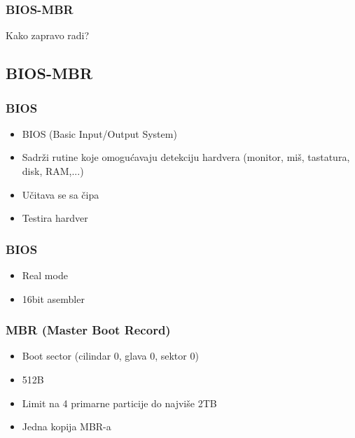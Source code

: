 \documentclass{beamer}
\begin{document}
\begin{frame}
    \frametitle{BIOS-MBR}
    \begin{center}
        \large{Kako zapravo radi?}
    \end{center}
\end{frame}

\subsection*{BIOS-MBR}
\begin{frame}
    \frametitle{BIOS}
    \begin{itemize}
        \item BIOS (Basic Input/Output System) \newline
        \item Sadrži rutine koje omogućavaju detekciju hardvera (monitor, miš, tastatura, disk, RAM,...) \newline
        \item Učitava se sa čipa \newline
        \item Testira hardver
    \end{itemize}
\end{frame}

\begin{frame}
    \frametitle{BIOS}
    \begin{itemize}
        \item Real mode \newline
        \item 16bit asembler
    \end{itemize}
\end{frame}

\begin{frame}
    \frametitle{MBR (Master Boot Record)}
    \begin{itemize}
        \item Boot sector (cilindar 0, glava 0, sektor 0) \newline
        \item 512B \newline
        \item Limit na 4 primarne particije do najviše 2TB \newline
        \item Jedna kopija MBR-a \newline
    \end{itemize}
\end{frame}
\end{document}
